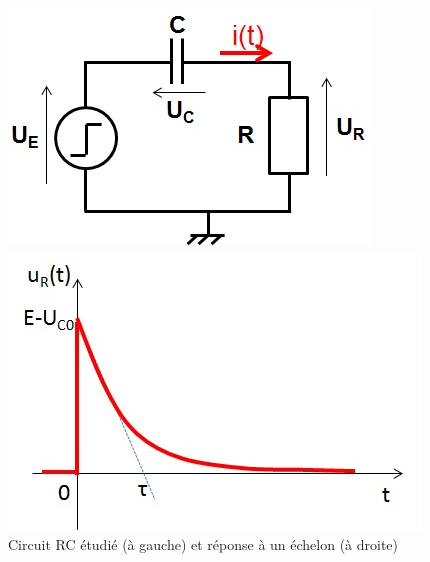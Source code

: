 	\begin{figure}[h!]
	\centering
	\begin{minipage}[c]{0.4\linewidth}
		\includegraphics[scale=0.6]{images/circuit_RC_reponse_indicielle.jpg}
	\end{minipage} \hfill
	\begin{minipage}[c]{0.50\linewidth}
		\includegraphics[scale=0.6]{images/reponse_RC_indicielle.jpg} 	
	\end{minipage}
	\caption{Circuit RC étudié (à gauche) et réponse à un échelon (à droite)}	
	\label{Fig:Circuit_RC_Laplace_inverse} 
	\end{figure}

